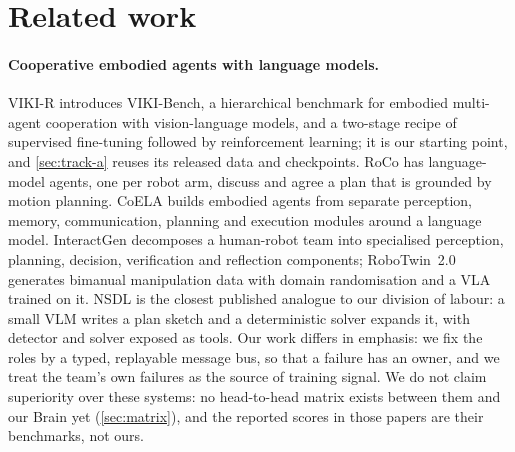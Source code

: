 \section{Related work}\label{sec:related}

\paragraph{Cooperative embodied agents with language models.}
VIKI-R \citep{kang2025vikir} introduces VIKI-Bench, a hierarchical benchmark for embodied multi-agent cooperation with vision-language models, and a two-stage recipe of supervised fine-tuning followed by reinforcement learning; it is our starting point, and \cref{sec:track-a} reuses its released data and checkpoints.
RoCo \citep{mandi2024roco} has language-model agents, one per robot arm, discuss and agree a plan that is grounded by motion planning.
CoELA \citep{zhang2024coela} builds embodied agents from separate perception, memory, communication, planning and execution modules around a language model.
InteractGen \citep{sun2026interactgen} decomposes a human-robot team into specialised perception, planning, decision, verification and reflection components; RoboTwin~2.0 \citep{chen2025robotwin2} generates bimanual manipulation data with domain randomisation and a VLA trained on it.
NSDL \citep{tan2026nsdl} is the closest published analogue to our division of labour: a small VLM writes a plan sketch and a deterministic solver expands it, with detector and solver exposed as tools.
Our work differs in emphasis: we fix the roles by a typed, replayable message bus, so that a failure has an owner, and we treat the team's own failures as the source of training signal.
We do not claim superiority over these systems: no head-to-head matrix exists between them and our Brain yet (\cref{sec:matrix}), and the reported scores in those papers are their benchmarks, not ours.

